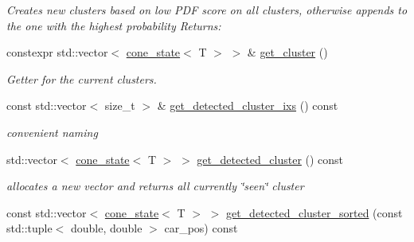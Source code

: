 \begin{DoxyCompactItemize}
\begin{DoxyCompactList}\small\item\em Creates new clusters based on low P\+DF score on all clusters, otherwise appends to the one with the highest probability Returns\+: \end{DoxyCompactList}\item 
\mbox{\label{classclara_1_1data__association_aaccbc2c618ca8b272278954585722abb}} 
constexpr std\+::vector$<$ \hyperlink{classclara_1_1cone__state}{cone\+\_\+state}$<$ T $>$ $>$ \& \hyperlink{classclara_1_1data__association_aaccbc2c618ca8b272278954585722abb}{get\+\_\+cluster} ()
\begin{DoxyCompactList}\small\item\em Getter for the current clusters. \end{DoxyCompactList}\item 
\mbox{\label{classclara_1_1data__association_a1547077bb5ff74179acee932911db500}} 
const std\+::vector$<$ size\+\_\+t $>$ \& \hyperlink{classclara_1_1data__association_a1547077bb5ff74179acee932911db500}{get\+\_\+detected\+\_\+cluster\+\_\+ixs} () const
\begin{DoxyCompactList}\small\item\em convenient naming \end{DoxyCompactList}\item 
\mbox{\label{classclara_1_1data__association_a8258daa7db2fabd9b5f28175412015e4}} 
std\+::vector$<$ \hyperlink{classclara_1_1cone__state}{cone\+\_\+state}$<$ T $>$ $>$ \hyperlink{classclara_1_1data__association_a8258daa7db2fabd9b5f28175412015e4}{get\+\_\+detected\+\_\+cluster} () const
\begin{DoxyCompactList}\small\item\em allocates a new vector and returns all currently \char`\"{}seen\char`\"{} cluster \end{DoxyCompactList}\item 
\mbox{\label{classclara_1_1data__association_a52355e49cb8d3a48dbc9ddd5e40bb6fd}} 
const std\+::vector$<$ \hyperlink{classclara_1_1cone__state}{cone\+\_\+state}$<$ T $>$ $>$ \hyperlink{classclara_1_1data__association_a52355e49cb8d3a48dbc9ddd5e40bb6fd}{get\+\_\+detected\+\_\+cluster\+\_\+sorted} (const std\+::tuple$<$ double, double $>$ car\+\_\+pos) const

\end{DoxyCompactItemize}
